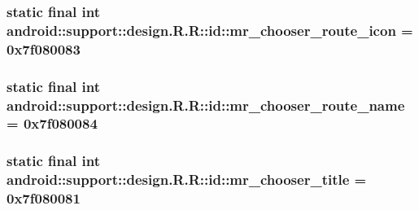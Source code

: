 \hypertarget{classandroid_1_1support_1_1design_1_1_r_1_1id_bce44dd3c1f4cf7d9735a6134639b28a}{
\subsubsection[{mr\_\-chooser\_\-route\_\-icon}]{\setlength{\rightskip}{0pt plus 5cm}static final int android::support::design.R.R::id::mr\_\-chooser\_\-route\_\-icon = 0x7f080083}}
\label{classandroid_1_1support_1_1design_1_1_r_1_1id_bce44dd3c1f4cf7d9735a6134639b28a}


\hypertarget{classandroid_1_1support_1_1design_1_1_r_1_1id_f808c3c8abbaf8c3f44f90390867840d}{
\subsubsection[{mr\_\-chooser\_\-route\_\-name}]{\setlength{\rightskip}{0pt plus 5cm}static final int android::support::design.R.R::id::mr\_\-chooser\_\-route\_\-name = 0x7f080084}}
\label{classandroid_1_1support_1_1design_1_1_r_1_1id_f808c3c8abbaf8c3f44f90390867840d}


\hypertarget{classandroid_1_1support_1_1design_1_1_r_1_1id_50879528e124213ef522c40bcaa44887}{
\subsubsection[{mr\_\-chooser\_\-title}]{\setlength{\rightskip}{0pt plus 5cm}static final int android::support::design.R.R::id::mr\_\-chooser\_\-title = 0x7f080081}}
\label{classandroid_1_1support_1_1design_1_1_r_1_1id_50879528e124213ef522c40bcaa44887}



